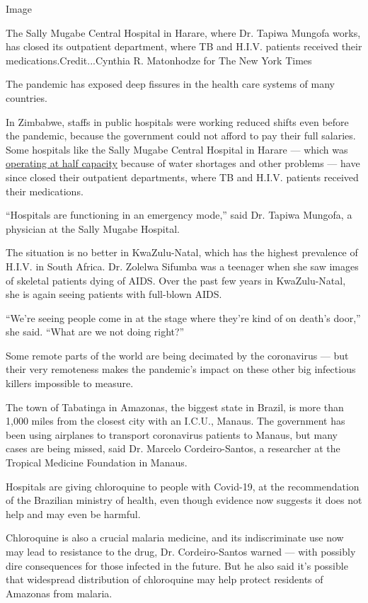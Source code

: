 Image

The Sally Mugabe Central Hospital in Harare, where Dr. Tapiwa Mungofa
works, has closed its outpatient department, where TB and H.I.V.
patients received their medications.Credit...Cynthia R. Matonhodze for
The New York Times

The pandemic has exposed deep fissures in the health care systems of
many countries.

In Zimbabwe, staffs in public hospitals were working reduced shifts even
before the pandemic, because the government could not afford to pay
their full salaries. Some hospitals like the Sally Mugabe Central
Hospital in Harare --- which was
\href{https://www.newsday.co.zw/2020/02/sally-mugabe-hospital-operating-at-45-capacity/}{operating
at half capacity} because of water shortages and other problems --- have
since closed their outpatient departments, where TB and H.I.V. patients
received their medications.

``Hospitals are functioning in an emergency mode,'' said Dr. Tapiwa
Mungofa, a physician at the Sally Mugabe Hospital.

The situation is no better in KwaZulu-Natal, which has the highest
prevalence of H.I.V. in South Africa. Dr. Zolelwa Sifumba was a teenager
when she saw images of skeletal patients dying of AIDS. Over the past
few years in KwaZulu-Natal, she is again seeing patients with full-blown
AIDS.

``We're seeing people come in at the stage where they're kind of on
death's door,'' she said. ``What are we not doing right?''

Some remote parts of the world are being decimated by the coronavirus
--- but their very remoteness makes the pandemic's impact on these other
big infectious killers impossible to measure.

The town of Tabatinga in Amazonas, the biggest state in Brazil, is more
than 1,000 miles from the closest city with an I.C.U., Manaus. The
government has been using airplanes to transport coronavirus patients to
Manaus, but many cases are being missed, said Dr. Marcelo
Cordeiro-Santos, a researcher at the Tropical Medicine Foundation in
Manaus.

Hospitals are giving chloroquine to people with Covid-19, at the
recommendation of the Brazilian ministry of health, even though evidence
now suggests it does not help and may even be harmful.

Chloroquine is also a crucial malaria medicine, and its indiscriminate
use now may lead to resistance to the drug, Dr. Cordeiro-Santos warned
--- with possibly dire consequences for those infected in the future.
But he also said it's possible that widespread distribution of
chloroquine may help protect residents of Amazonas from malaria.


